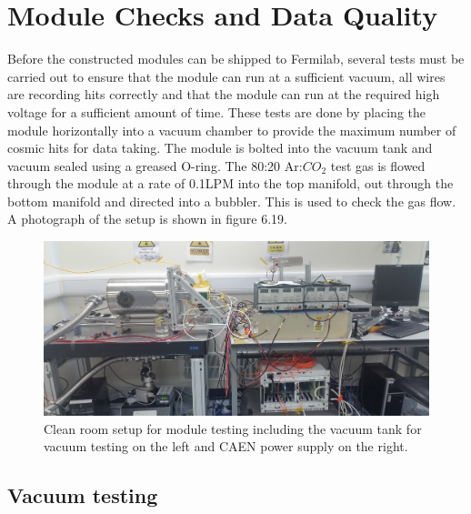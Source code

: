 \section{Module Checks and Data Quality}

Before the constructed modules can be shipped to Fermilab, several tests must be carried out to ensure that the module can run at a sufficient vacuum, all wires are recording hits correctly and that the module can run at the required high voltage for a sufficient amount of time. These tests are done by placing the module horizontally into a vacuum chamber to provide the maximum number of cosmic hits for data taking. The module is bolted into the vacuum tank and vacuum sealed using a greased O-ring. The 80:20 Ar:$CO_2$ test gas is flowed through the module at a rate of 0.1LPM into the top manifold, out through the bottom manifold and directed into a bubbler. This is used to check the gas flow. A photograph of the setup is shown in figure 6.19.

\begin{figure}[!h]
\centering
\includegraphics[scale=0.4]{Figures/DAQsetup1}
\decoRule
\caption{Clean room setup for module testing including the vacuum tank for vacuum testing on the left and CAEN power supply on the right.}
\label{fig:DAQsetup1}
\end{figure}

\subsection{Vacuum testing}

